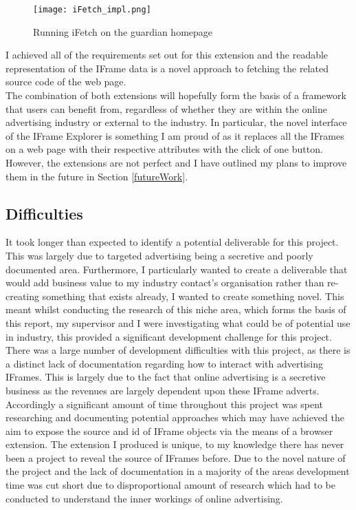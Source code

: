 \documentclass[12pt]{article}
\begin{document}
\begin{figure}[H]
    \centering
    \texttt{[image: iFetch\_impl.png]}
    \caption{Running iFetch on the guardian homepage}
    \label{fig:iFetch_impl}
\end{figure}

I achieved all of the requirements set out for this extension and the readable representation of the IFrame data is a novel approach to fetching the related source code of the web page. \\

The combination of both extensions will hopefully form the basis of a framework that users can benefit from, regardless of whether they are within the online advertising industry or external to the industry. In particular, the novel interface of the IFrame Explorer is something I am proud of as it replaces all the IFrames on a web page with their respective attributes with the click of one button. However, the extensions are not perfect and I have outlined my plans to improve them in the future in Section \ref{futureWork}.  

\subsection{Difficulties} \label{diff}
It took longer than expected to identify a potential deliverable for this project. This was largely  due to targeted advertising being a secretive and poorly documented area. Furthermore, I particularly wanted to create a deliverable that would add business value to my industry contact's organisation rather than re-creating something that exists already, I wanted to create something novel. This meant whilst conducting the research of this niche area, which forms the basis of this report, my supervisor and I were investigating  what could be of potential use in industry, this provided a significant development challenge for this project. \\

There was a large number of development difficulties with this project, as there is a distinct lack of documentation regarding how to interact with advertising IFrames. This is largely due to the fact that online advertising is a secretive business as the revenues are largely dependent upon these IFrame adverts. Accordingly a significant amount of time throughout this project was spent researching and documenting potential approaches which may have achieved the aim to expose the source and id of IFrame objects via the means of a browser extension. The extension I produced is unique, to my knowledge there has never been a project to reveal the source of IFrames before. Due to the novel nature of the project and the lack of documentation in a majority of the areas development time was cut short due to disproportional amount of research which had to be conducted to understand the inner workings of online advertising. \\
\end{document}
